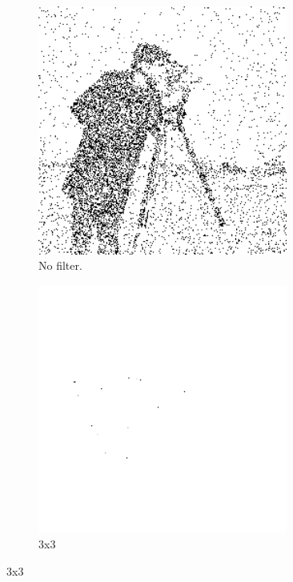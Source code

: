 \begin{figure}[h]
    \centering

    \begin{subfigure}[b]{0.3\textwidth}
        \includegraphics[width=0.9\textwidth]{../code/2_out/2-1_gaus.png}
        \caption{No filter.}
        \label{fig:2-1-2:1}
    \end{subfigure}
    \begin{subfigure}[b]{0.3\textwidth}
        \includegraphics[width=0.9\textwidth]{../code/2_out/2-1_gaus_3x3.png}
        \caption{3x3}
        \label{fig:2-1-2:2}
    \end{subfigure}


\end{figure}
